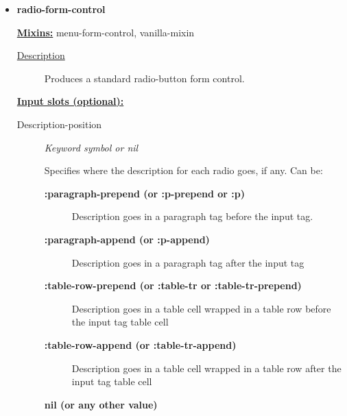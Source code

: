 \documentclass [11pt]{book}
\begin{document}
\begin{itemize}
\item {}
\label{prim:radio-form-control}
\textbf{radio-form-control}


\textbf{
\underline{Mixins:}} menu-form-control, vanilla-mixin





\begin{description}

\item [
\underline{Description}]


Produces a standard radio-button form control.



\end{description}








\textbf{
\underline{Input slots (optional):}}

\begin{description}

\item [Description-position]
\emph{Keyword symbol or nil}

 Specifies where the description for each radio goes, if any.
Can be:


\begin{description}


\item[
\textbf{:paragraph-prepend (or :p-prepend or :p)}]

Description goes in a paragraph tag before the input tag.


\item[
\textbf{:paragraph-append (or :p-append)}]

Description goes in a paragraph tag after the input tag


\item[
\textbf{:table-row-prepend (or :table-tr or :table-tr-prepend)}]

Description goes in a table cell wrapped in a table row before the input tag table cell


\item[
\textbf{:table-row-append (or :table-tr-append)}]

Description goes in a table cell wrapped in a table row after the input tag table cell


\item[
\textbf{nil (or any other value)}]


\end{description}
\end{description}
\end{itemize}
\end{document}
